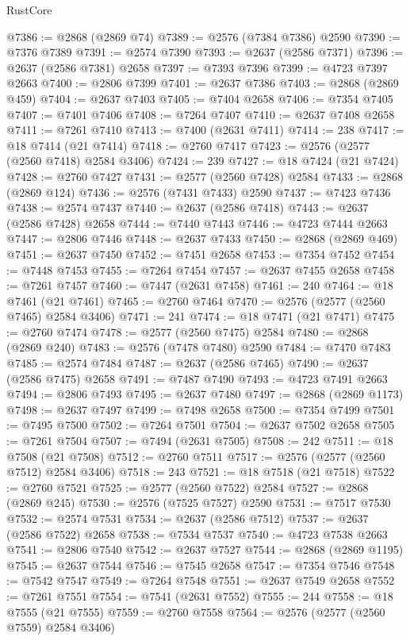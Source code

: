 \begin{lexlean}{RustCore}
\begin{coremodule}
@7386 := @2868 (@2869 @74)
@7389 := @2576 (@7384 @7386) @2590
@7390 := @7376 @7389
@7391 := @2574 @7390
@7393 := @2637 (@2586 @7371)
@7396 := @2637 (@2586 @7381) @2658
@7397 := @7393 @7396
@7399 := @4723 @7397 @2663
@7400 := @2806 @7399
@7401 := @2637 @7386
@7403 := @2868 (@2869 @459)
@7404 := @2637 @7403
@7405 := @7404 @2658
@7406 := @7354 @7405
@7407 := @7401 @7406
@7408 := @7264 @7407
@7410 := @2637 @7408 @2658
@7411 := @7261 @7410
@7413 := @7400 (@2631 @7411)
@7414 := 238
@7417 := @18 @7414 (@21 @7414)
@7418 := @2760 @7417
@7423 := @2576 (@2577 (@2560 @7418) @2584 @3406)
@7424 := 239
@7427 := @18 @7424 (@21 @7424)
@7428 := @2760 @7427
@7431 := @2577 (@2560 @7428) @2584
@7433 := @2868 (@2869 @124)
@7436 := @2576 (@7431 @7433) @2590
@7437 := @7423 @7436
@7438 := @2574 @7437
@7440 := @2637 (@2586 @7418)
@7443 := @2637 (@2586 @7428) @2658
@7444 := @7440 @7443
@7446 := @4723 @7444 @2663
@7447 := @2806 @7446
@7448 := @2637 @7433
@7450 := @2868 (@2869 @469)
@7451 := @2637 @7450
@7452 := @7451 @2658
@7453 := @7354 @7452
@7454 := @7448 @7453
@7455 := @7264 @7454
@7457 := @2637 @7455 @2658
@7458 := @7261 @7457
@7460 := @7447 (@2631 @7458)
@7461 := 240
@7464 := @18 @7461 (@21 @7461)
@7465 := @2760 @7464
@7470 := @2576 (@2577 (@2560 @7465) @2584 @3406)
@7471 := 241
@7474 := @18 @7471 (@21 @7471)
@7475 := @2760 @7474
@7478 := @2577 (@2560 @7475) @2584
@7480 := @2868 (@2869 @240)
@7483 := @2576 (@7478 @7480) @2590
@7484 := @7470 @7483
@7485 := @2574 @7484
@7487 := @2637 (@2586 @7465)
@7490 := @2637 (@2586 @7475) @2658
@7491 := @7487 @7490
@7493 := @4723 @7491 @2663
@7494 := @2806 @7493
@7495 := @2637 @7480
@7497 := @2868 (@2869 @1173)
@7498 := @2637 @7497
@7499 := @7498 @2658
@7500 := @7354 @7499
@7501 := @7495 @7500
@7502 := @7264 @7501
@7504 := @2637 @7502 @2658
@7505 := @7261 @7504
@7507 := @7494 (@2631 @7505)
@7508 := 242
@7511 := @18 @7508 (@21 @7508)
@7512 := @2760 @7511
@7517 := @2576 (@2577 (@2560 @7512) @2584 @3406)
@7518 := 243
@7521 := @18 @7518 (@21 @7518)
@7522 := @2760 @7521
@7525 := @2577 (@2560 @7522) @2584
@7527 := @2868 (@2869 @245)
@7530 := @2576 (@7525 @7527) @2590
@7531 := @7517 @7530
@7532 := @2574 @7531
@7534 := @2637 (@2586 @7512)
@7537 := @2637 (@2586 @7522) @2658
@7538 := @7534 @7537
@7540 := @4723 @7538 @2663
@7541 := @2806 @7540
@7542 := @2637 @7527
@7544 := @2868 (@2869 @1195)
@7545 := @2637 @7544
@7546 := @7545 @2658
@7547 := @7354 @7546
@7548 := @7542 @7547
@7549 := @7264 @7548
@7551 := @2637 @7549 @2658
@7552 := @7261 @7551
@7554 := @7541 (@2631 @7552)
@7555 := 244
@7558 := @18 @7555 (@21 @7555)
@7559 := @2760 @7558
@7564 := @2576 (@2577 (@2560 @7559) @2584 @3406)

\end{coremodule}
\end{lexlean}
